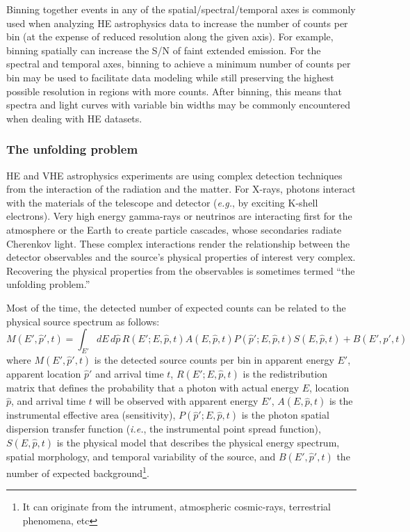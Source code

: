 \documentclass[11pt,a4paper]{ivoa}
\begin{document}
Binning together events in any of the spatial/spectral/temporal axes is commonly used when analyzing \gls{HE} astrophysics data to increase the number of counts per bin (at the expense of reduced resolution along the given axis).  For example, binning spatially can increase the S/N of faint extended emission.  For the spectral and temporal axes, binning to achieve a minimum number of counts per bin may be used  to facilitate data modeling while still preserving the highest possible resolution in regions with more counts.  After binning, this means that  spectra and light curves with variable bin widths may be commonly encountered when dealing with \gls{HE} datasets.

\subsubsection{The unfolding problem}


\gls{HE} and \gls{VHE} astrophysics experiments are using complex detection techniques from the interaction of the radiation
and the matter. For X-rays, photons interact with the materials of the telescope and detector ({\em e.g.\/}, by exciting K-shell electrons).
Very high energy gamma-rays or neutrinos are interacting first for the atmosphere or the Earth to create particle cascades,
whose secondaries radiate Cherenkov light. These complex interactions render the relationship between the detector observables
and the source's physical properties of interest very complex. Recovering the physical properties from the  observables
is sometimes termed ``the unfolding problem.''

Most of the time, the detected number of expected counts can be related to the physical source spectrum as follows:
\begin{equation}\label{eqn:phaspec}
M(E', \hat{p}', t) = \int_{E'} dE\, d\hat{p}\, R(E'; E, \hat{p}, t) A(E, \hat{p}, t) P(\hat{p}'; E, \hat{p}, t) S(E, \hat{p}, t) + B(E', \hat{p}', t)
\end{equation}
where $M(E', \hat{p}', t)$ is the detected source counts per bin in apparent energy $E'$, apparent location $\hat{p}'$ and
arrival time $t$, $R(E'; E, \hat{p}, t)$ is the redistribution matrix that defines the probability that a photon with
actual energy $E$, location $\hat{p}$, and arrival time $t$ will be observed with apparent energy $E'$, $A(E, \hat{p}, t)$ is the instrumental
effective area (sensitivity), $P(\hat{p}'; E, \hat{p}, t)$ is the photon spatial dispersion transfer function ({\em i.e.\/},
the instrumental point spread function), $S(E, \hat{p}, t)$ is the physical model that describes the physical energy spectrum,
spatial morphology, and temporal variability of the source, and $B(E', \hat{p}', t)$ the number of expected background\footnote{It can
originate from the intrument, atmospheric cosmic-rays, terrestrial phenomena, etc}.
\end{document}
